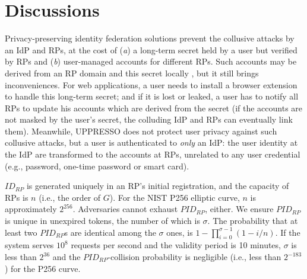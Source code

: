 \section{Discussions}
\label{sec:discussion}

Privacy-preserving identity federation solutions \cite{ELPASSO,UnlimitID,idemix,PseudoID,Opaak,uprov}
 prevent the collusive attacks by an IdP and RPs,
    at the cost of (\emph{a}) a long-term secret held by a user but verified by RPs
        and (\emph{b}) user-managed accounts \cite{PseudoID} for different RPs.
Such accounts may be derived from an RP domain and this secret locally \cite{ELPASSO,UnlimitID,Opaak,uprov,idemix},
  but it still brings inconveniences.
For web applications, a user needs to install a browser extension to handle this long-term secret;
  and if it is lost or leaked,
       a user has to notify all RPs to update his accounts which are derived from the secret
        (if the accounts are not masked by the user's secret, the colluding IdP and RPs can eventually link them).
Meanwhile,
UPPRESSO does not protect user privacy against such collusive attacks,
    but a user is authenticated to \emph{only} an IdP:
         the user identity at the IdP
                are transformed to the accounts at RPs, unrelated to any user credential (e.g., password, one-time password or smart card).




\vspace{0.4mm}
$ID_{RP}$ is generated uniquely in an RP's initial registration,
    and the capacity of RPs is $n$ (i.e., the order of $G$). For the NIST P256 elliptic curve, $n$ is approximately $2^{256}$.
Adversaries cannot exhaust $PID_{RP}$, either.
We ensure $PID_{RP}$ is unique in unexpired tokens,
    the number of which is $\sigma$.
The probability that at least two $PID_{RP}$s are identical among the $\sigma$ ones,
    is $1-\prod_{i=0}^{\sigma-1}(1-i/n)$.
If the system serves $10^{8}$ requests per second and the validity period is 10 minutes,
     $\sigma$ is less than $2^{36}$ and the $PID_{RP}$-collision probability is negligible (i.e., less than $2^{-183}$) for the P256 curve.

